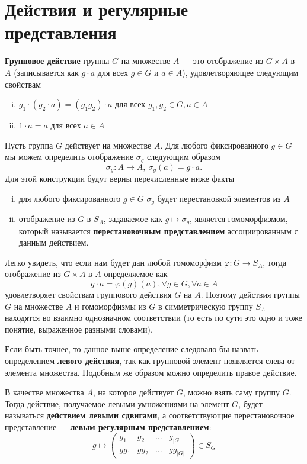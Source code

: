 \section{Действия и регулярные представления}\label{action}

\begin{definition}
  \textbf{Групповое действие} группы $G$ на множестве $A$ --- это отображение из $G \times A$ в $A$ (записывается как $g \cdot a$ для всех $g \in G$ и $a \in A$), удовлетворяющее следующим свойствам
  \begin{enumerate}[(i)]
  \item $g_1 \cdot (g_2 \cdot a) = (g_1 g_2) \cdot a$ для всех $g_1, g_2 \in G, a \in A$
  \item $1 \cdot a = a$ для всех $a \in A$
  \end{enumerate}
\end{definition}

Пусть группа $G$ действует на множестве $A$. Для любого фиксированного $g \in G$ мы можем определить отображение $\sigma_g$ следующим образом
\[
	\sigma_g: A \rightarrow A,\ \sigma_g(a)=g \cdot a.	
\]
Для этой конструкции будут верны перечисленные ниже факты
\begin{enumerate}[(i)]
  \item для любого фиксированного $g \in G$ $\sigma_g$ будет перестановкой элементов из $A$
  \item отображение из $G$ в $S_A$, задаваемое как $g \mapsto \sigma_g$, является гомоморфизмом, который называется \textbf{перестановочным представлением} ассоциированным с данным действием.
\end{enumerate}

Легко увидеть, что если нам будет дан любой гомоморфизм $\varphi: G \rightarrow S_A$, тогда отображение из $G \times A$ в $A$ определяемое как 
\[
	g \cdot a = \varphi(g)(a),  \forall g \in G, \forall a \in A
\]
удовлетворяет свойствам группового действия $G$ на $A$. Поэтому действия группы $G$ на множестве $A$ и гомоморфизмы из $G$ в симметрическую группу $S_A$ находятся во взаимно однозначном соответствии (то есть по сути это одно и тоже понятие, выраженное разными словами).

Если быть точнее, то данное выше определение следовало бы назвать определением \textbf{левого действия}, так как групповой элемент появляется слева от элемента множества. Подобным же образом можно определить правое действие.

В качестве множества $A$, на которое действует $G$, можно взять саму группу $G$. Тогда действие, получаемое левыми умножениями на элемент $G$, будет называться \textbf{действием левыми сдвигами}, а соответствующие перестановочное представление --- \textbf{левым регулярным представлением}:  
  \[
  	g \mapsto
  	\left( 
  	\begin{array}{cccc}
	g_1 & g_2 & \ldots & g_{|G|} \\
	g g_1 & g g_2 & \ldots & g g_{|G|}
	\end{array} 
	\right) \in S_G 
  \]
  
